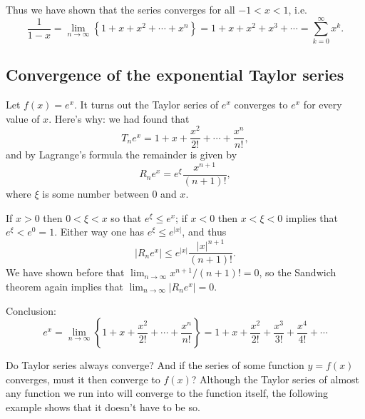 Thus we have shown that the series converges for all $-1<x<1$, i.e.
\[
\frac1{1-x} = \lim_{n\to\infty} \left\{1+x+x^2+\cdots+x^n \right\} =
1+x+x^2+x^3+\cdots = \sum_{k=0}^\infty x^k.
\]


\subsection{Convergence of the exponential Taylor series} %
Let $f(x)= e^x$. It turns out the Taylor series of $e^x$ converges to $e^x$
for every value of $x$. Here's why: we had found that
\[
T_ne^x = 1+ x+\frac{x^2}{2!}+\cdots+\frac{x^n}{n!},
\]
and by Lagrange's formula the remainder is given by
\[
R_ne^x = e^\xi \frac{x^{n+1}}{(n+1)!},
\]
where $\xi $ is some number between $0$ and $x$.

If $x>0$ then $0<\xi<x$ so that $e^\xi\leq e^x$; if $x<0$ then $x<\xi<0$
implies that $e^\xi<e^0=1$. Either way one has $e^\xi\leq e^{|x|}$, and
thus
\[
|R_ne^x|\leq e^{|x|}\frac{|x|^{n+1}}{(n+1)!}.
\]
We have shown before that $\lim_{n\to\infty} x^{n+1}/ (n+1)!=0$, so the Sandwich
theorem again implies that $\lim_{n\to\infty} |R_ne^x|=0$.

Conclusion:
\[
e^x =\lim_{n\to\infty} \left\{
1+x+\frac{x^2}{2!}+\cdots+\frac{x^n}{n!}\right\} =
1+x+\frac{x^2}{2!}+\frac{x^3}{3!}+\frac{x^4}{4!}+\cdots 
\]



Do Taylor series always converge?  And if the series of some function
$y=f(x)$ converges, must it then converge to $f(x)$?  Although the Taylor
series of almost any function we run into will converge to the function itself, the
following example shows that it doesn't have to be so.

